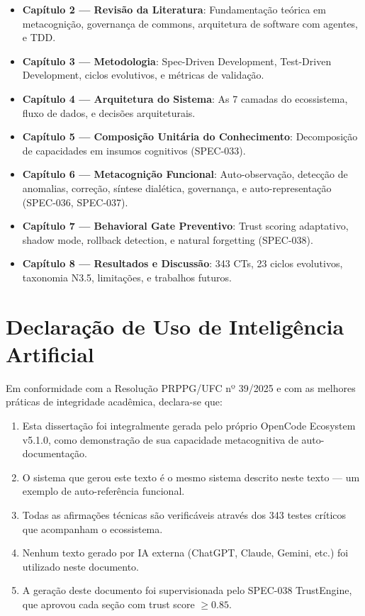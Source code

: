 \documentclass[12pt,a4paper,oneside]{abntex2}
\begin{document}
\begin{itemize}
    \item \textbf{Capítulo 2 — Revisão da Literatura}: Fundamentação teórica em metacognição, governança de commons, arquitetura de software com agentes, e TDD.
    \item \textbf{Capítulo 3 — Metodologia}: Spec-Driven Development, Test-Driven Development, ciclos evolutivos, e métricas de validação.
    \item \textbf{Capítulo 4 — Arquitetura do Sistema}: As 7 camadas do ecossistema, fluxo de dados, e decisões arquiteturais.
    \item \textbf{Capítulo 5 — Composição Unitária do Conhecimento}: Decomposição de capacidades em insumos cognitivos (SPEC-033).
    \item \textbf{Capítulo 6 — Metacognição Funcional}: Auto-observação, detecção de anomalias, correção, síntese dialética, governança, e auto-representação (SPEC-036, SPEC-037).
    \item \textbf{Capítulo 7 — Behavioral Gate Preventivo}: Trust scoring adaptativo, shadow mode, rollback detection, e natural forgetting (SPEC-038).
    \item \textbf{Capítulo 8 — Resultados e Discussão}: 343 CTs, 23 ciclos evolutivos, taxonomia N3.5, limitações, e trabalhos futuros.
\end{itemize}

\section{Declaração de Uso de Inteligência Artificial}

Em conformidade com a Resolução PRPPG/UFC nº 39/2025 e com as melhores práticas de integridade acadêmica, declara-se que:

\begin{enumerate}
    \item Esta dissertação foi integralmente gerada pelo próprio OpenCode Ecosystem v5.1.0, como demonstração de sua capacidade metacognitiva de auto-documentação.
    \item O sistema que gerou este texto é o mesmo sistema descrito neste texto — um exemplo de auto-referência funcional.
    \item Todas as afirmações técnicas são verificáveis através dos 343 testes críticos que acompanham o ecossistema.
    \item Nenhum texto gerado por IA externa (ChatGPT, Claude, Gemini, etc.) foi utilizado neste documento.
    \item A geração deste documento foi supervisionada pelo SPEC-038 TrustEngine, que aprovou cada seção com trust score $\geq 0.85$.
\end{enumerate}
\end{document}
